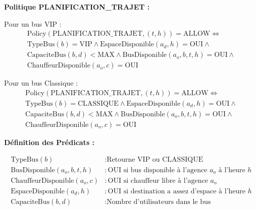 \documentclass[12pt,a4paper]{article}
\begin{document}
    \begin{definitionbox}
        \textbf{Politique PLANIFICATION\_TRAJET :}

        Pour un bus VIP :
        \begin{multline}
            \text{Policy}(\text{PLANIFICATION\_TRAJET}, (t, h)) = \text{ALLOW} \Leftrightarrow \\
            \text{TypeBus}(b) = \text{VIP} \wedge \text{EspaceDisponible}(a_d, h) = \text{OUI} \wedge \\
            \text{CapaciteBus}(b, d) < \text{MAX} \wedge \text{BusDisponible}(a_o, b, t, h) = \text{OUI} \wedge \\
            \text{ChauffeurDisponible}(a_o, c) = \text{OUI}
        \end{multline}

        Pour un bus Classique :
        \begin{multline}
            \text{Policy}(\text{PLANIFICATION\_TRAJET}, (t, h)) = \text{ALLOW} \Leftrightarrow \\
            \text{TypeBus}(b) = \text{CLASSIQUE} \wedge \text{EspaceDisponible}(a_d, h) = \text{OUI} \wedge \\
            \text{CapaciteBus}(b, d) < \text{MAX} \wedge \text{BusDisponible}(a_o, b, t, h) = \text{OUI} \wedge \\
            \text{ChauffeurDisponible}(a_o, c) = \text{OUI}
        \end{multline}
    \end{definitionbox}

    \textbf{Définition des Prédicats :}

    \begin{align}
        \text{TypeBus}(b) &: \text{Retourne VIP ou CLASSIQUE} \\
        \text{BusDisponible}(a_o, b, t, h) &: \text{OUI si bus disponible à l'agence } a_o \text{ à l'heure } h \\
        \text{ChauffeurDisponible}(a_o, c) &: \text{OUI si chauffeur libre à l'agence } a_o \\
        \text{EspaceDisponible}(a_d, h) &: \text{OUI si destination a assez d'espace à l'heure } h \\
        \text{CapaciteBus}(b, d) &: \text{Nombre d'utilisateurs dans le bus}
    \end{align}
\end{document}

